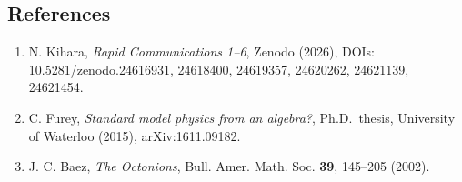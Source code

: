 \documentclass[
  a4paper,
]{article}
\providecommand{\tightlist}{%
  \setlength{\itemsep}{0pt}\setlength{\parskip}{0pt}}
\begin{document}
\subsection{References}\label{references}

\begin{enumerate}
\def\labelenumi{\arabic{enumi}.}
\tightlist
\item
  N. Kihara, \emph{Rapid Communications 1--6}, Zenodo (2026), DOIs:
  10.5281/zenodo.24616931, 24618400, 24619357, 24620262, 24621139,
  24621454.
\item
  C. Furey, \emph{Standard model physics from an algebra?},
  Ph.D.~thesis, University of Waterloo (2015), arXiv:1611.09182.
\item
  J. C. Baez, \emph{The Octonions}, Bull. Amer. Math. Soc. \textbf{39},
  145--205 (2002).
\end{enumerate}
\end{document}
